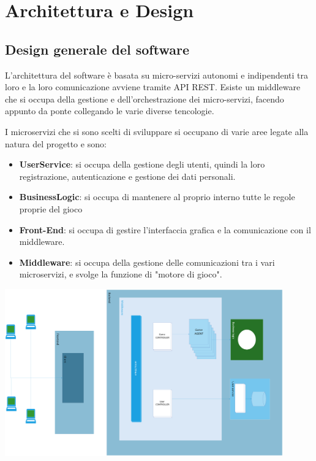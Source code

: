 \chapter{Architettura e Design}
\label{ch:architectures}

\section{Design generale del software}

L'architettura del software è basata su micro-servizi autonomi e indipendenti tra loro e la loro comunicazione avviene tramite API REST.
Esiste un middleware che si occupa della gestione e dell'orchestrazione dei micro-servizi, facendo appunto da ponte collegando le varie diverse tencologie.

I microservizi che si sono scelti di sviluppare si occupano di varie aree legate alla natura del progetto e sono:
\begin{itemize}
    \item \textbf{UserService}: si occupa della gestione degli utenti, quindi la loro registrazione, autenticazione e gestione dei dati personali.
    \item \textbf{BusinessLogic}: si occupa di mantenere al proprio interno tutte le regole proprie del gioco
    \item \textbf{Front-End}: si occupa di gestire l'interfaccia grafica e la comunicazione con il middleware.
    \item \textbf{Middleware}: si occupa della gestione delle comunicazioni tra i vari microservizi, e svolge la funzione di "motore di gioco".
\end{itemize}


\includegraphics[width=12cm]{report/img/Architecture.png}\\[10.5cm]

